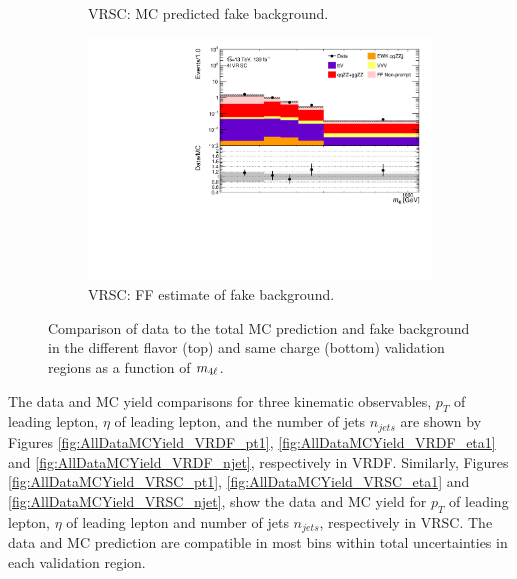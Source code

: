 \begin{figure}[htb]
\begin{subfigure}{.48\textwidth}
        \caption{VRSC: MC predicted fake background.\label{subfig:VRSCMCRed}}
    \end{subfigure}
    \begin{subfigure}{.48\textwidth}
        \centering
        \includegraphics[width = 0.85\linewidth]{figures/Analysis/Background/Overlay_VRSC_FFApplied_M4l.pdf}
        \caption{VRSC: FF estimate of fake background.\label{subfig:VRSCFF}}
    \end{subfigure}
    \caption{ Comparison of data to the total MC prediction and fake background in the different flavor (top) and same charge (bottom) validation regions as a function of $m_{4\ell}$.\label{fig:VRDataMCYield}}
\end{figure}

The data and MC yield comparisons for three kinematic observables, $p_{T}$ of leading lepton, $\eta$ of leading lepton, and the number of jets $n_{jets}$ are shown by Figures \ref{fig:AllDataMCYield_VRDF_pt1}, \ref{fig:AllDataMCYield_VRDF_eta1} and \ref{fig:AllDataMCYield_VRDF_njet}, respectively in VRDF. Similarly, Figures \ref{fig:AllDataMCYield_VRSC_pt1}, \ref{fig:AllDataMCYield_VRSC_eta1} and \ref{fig:AllDataMCYield_VRSC_njet}, show the data and MC yield for $p_{T}$ of leading lepton, $\eta$ of leading lepton and number of jets $n_{jets}$, respectively in VRSC. The data and MC prediction are compatible in most bins within total uncertainties in each validation region.


